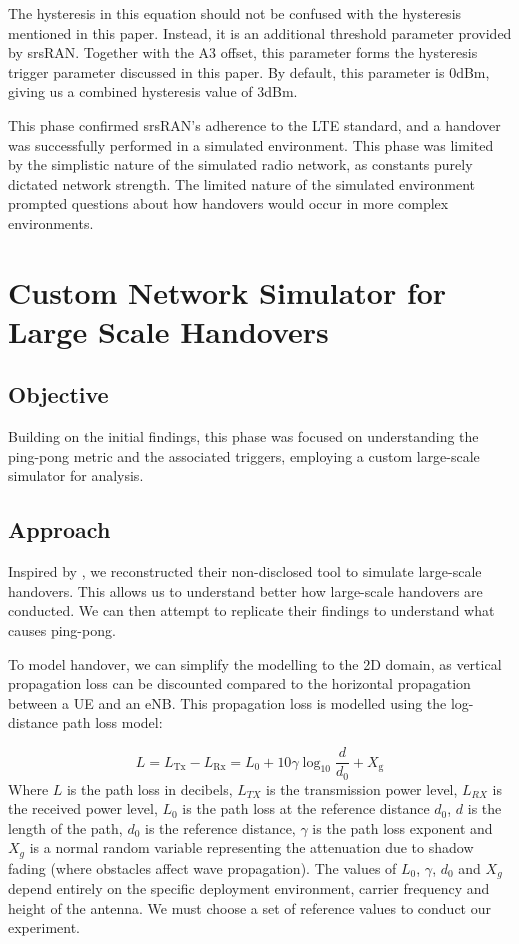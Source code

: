 The hysteresis in this equation should not be confused with the hysteresis mentioned in this paper. Instead, it is an additional threshold parameter provided by srsRAN. Together with the A3 offset, this parameter forms the hysteresis trigger parameter discussed in this paper. By default, this parameter is 0dBm, giving us a combined hysteresis value of 3dBm.

This phase confirmed srsRAN's adherence to the LTE standard, and a handover was successfully performed in a simulated environment. This phase was limited by the simplistic nature of the simulated radio network, as constants purely dictated network strength. The limited nature of the simulated environment prompted questions about how handovers would occur in more complex environments.

\section{Custom Network Simulator for Large Scale Handovers}
\label{sec:exp:custom}
\subsection{Objective}
Building on the initial findings, this phase was focused on understanding the ping-pong metric and the associated triggers, employing a custom large-scale simulator for analysis.

\subsection{Approach}
Inspired by \citet{hatipoglu_handover-based_2020}, we reconstructed their non-disclosed tool to simulate large-scale handovers. This allows us to understand better how large-scale handovers are conducted. We can then attempt to replicate their findings to understand what causes ping-pong.

To model handover, we can simplify the modelling to the 2D domain, as vertical propagation loss can be discounted compared to the horizontal propagation between a UE and an eNB. This propagation loss is modelled using the log-distance path loss model\citep{sun_path_2015}:

\begin{equation}
     L=L_{\text{Tx}}-L_{\text{Rx}}=L_{0}+10\gamma \log _{10}{\frac {d}{d_{0}}}+X_{\text{g}}
\end{equation}
Where $L$ is the path loss in decibels, $L_{TX}$ is the transmission power level, $L_{RX}$ is the received power level, $L_0$ is the path loss at the reference distance $d_0$, $d$ is the length of the path, $d_0$ is the reference distance, $\gamma$ is the path loss exponent and $X_g$ is a normal random variable representing the attenuation due to shadow fading (where obstacles affect wave propagation). The values of $L_0$, $\gamma$, $d_0$ and $X_g$ depend entirely on the specific deployment environment, carrier frequency and height of the antenna. We must choose a set of reference values to conduct our experiment.

